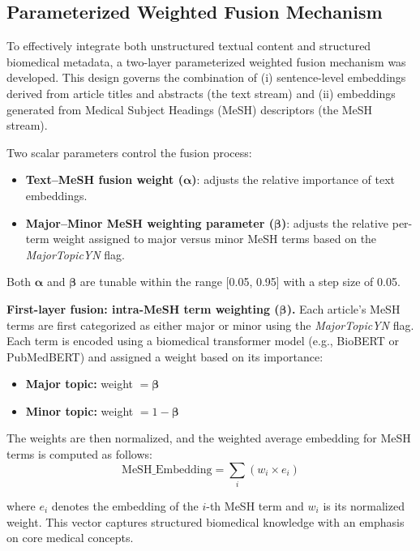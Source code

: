 \documentclass[authorproof,JACIII,researchpaper]{fujipressarticle}
\begin{document}
\subsection{Parameterized Weighted Fusion Mechanism}
To effectively integrate both unstructured textual content and structured biomedical metadata,
a two-layer parameterized weighted fusion mechanism was developed.
This design governs the combination of
(i) sentence-level embeddings derived from article titles and abstracts (the text stream) and
(ii) embeddings generated from Medical Subject Headings (MeSH) descriptors (the MeSH stream).

Two scalar parameters control the fusion process:
\begin{itemize}
    \item \textbf{Text--MeSH fusion weight ($\boldsymbol{\alpha}$)}: adjusts the relative importance of text embeddings.
    \item \textbf{Major--Minor MeSH weighting parameter ($\boldsymbol{\beta}$)}: adjusts the relative per-term weight assigned to major versus minor MeSH terms based on the \textit{MajorTopicYN} flag.
\end{itemize}

Both $\boldsymbol{\alpha}$ and $\boldsymbol{\beta}$ are tunable within the range [0.05, 0.95] with a step size of 0.05.

\noindent\textbf{First-layer fusion: intra-MeSH term weighting ($\boldsymbol{\beta}$).}
Each article's MeSH terms are first categorized as either major or minor using the \textit{MajorTopicYN} flag.
Each term is encoded using a biomedical transformer model (e.g., BioBERT or PubMedBERT) and assigned a weight based on its importance:

\begin{itemize}
    \item \textbf{Major topic:} weight $= \boldsymbol{\beta}$
    \item \textbf{Minor topic:} weight $= 1 - \boldsymbol{\beta}$
\end{itemize}

The weights are then normalized, and the weighted average embedding for MeSH terms is computed as follows:
\begin{equation}
\text{MeSH\_Embedding} = \sum_i (w_i \times e_i)
\label{eq:mesh_embedding}
\end{equation}

where $e_i$ denotes the embedding of the $i$-th MeSH term and $w_i$ is its normalized weight.
This vector captures structured biomedical knowledge with an emphasis on core medical concepts.
\end{document}
